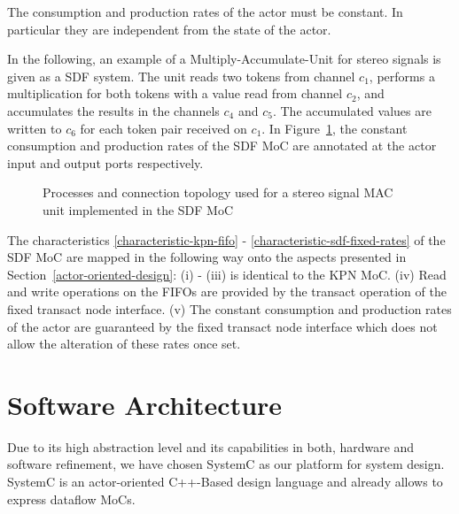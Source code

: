 \begin{characteristic}\label{characteristic-sdf-fixed-rates}
The consumption and production rates of the actor must be constant.
In particular they are independent from the state of the actor.
\end{characteristic}

In the following, an example of a Multiply-Accumulate-Unit for stereo signals is given
as a SDF system. The unit reads two tokens from channel $c_1$,
performs a multiplication for both tokens with a value read from channel $c_2$,
and accumulates the results in the channels $c_4$ and
$c_5$. The accumulated values are written to $c_6$ for each
token pair received on $c_1$.
In Figure~\ref{fig:sdf-mac-unit},
the constant consumption and production rates of the SDF
MoC are annotated at the actor input and output ports
respectively.

\begin{figure}[h]
\centering

\caption{Processes and connection topology used for a stereo signal MAC
  unit implemented in the SDF MoC}
\label{fig:sdf-mac-unit}
\end{figure}

The characteristics \ref{characteristic-kpn-fifo} -
\ref{characteristic-sdf-fixed-rates} of the SDF MoC are mapped in the following way
onto the aspects presented in Section~\ref{actor-oriented-design}: (i) - (iii) is identical
to the KPN MoC.
(iv) Read and write operations on the FIFOs are provided by the transact
operation of the fixed transact node interface.
(v) The constant consumption and production rates of the actor are
guaranteed by the fixed transact node interface which does
not allow the alteration of these rates once set.

\section{Software Architecture}\label{software-architecture}

Due to its high abstraction level and its capabilities in both,
hardware and software refinement, we have chosen SystemC
\cite{systemc-lrm:2003,glms:2002} as our platform for system design.
SystemC is an actor-oriented C++-Based design language and
already allows to express dataflow MoCs.

